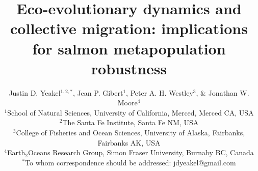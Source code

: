 \documentclass{revtex4}
\begin{document}
\title{Eco-evolutionary dynamics and collective migration: implications for salmon metapopulation robustness}
\author{
Justin D. Yeakel${}^{1,2,*}$, Jean P. Gibert${}^{1}$, Peter A. H. Westley${}^{3}$, \& Jonathan W. Moore${}^{4}$ \\
${}^1$School of Natural Sciences, University of California, Merced, Merced CA, USA \\
${}^2$The Santa Fe Institute, Santa Fe NM, USA \\
${}^3$College of Fisheries and Ocean Sciences, University of Alaska, Fairbanks, Fairbanks AK, USA \\
${}^4$Earth${}_2$Oceans Research Group, Simon Fraser University, Burnaby BC, Canada \\
${}^*$To whom correspondence should be addressed: jdyeakel@gmail.com
}
\end{document}
